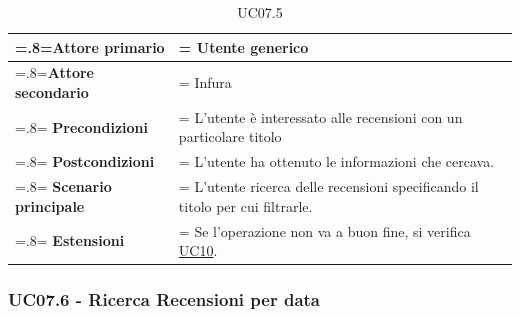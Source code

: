             \begin{table}[H]
                \centering
                \renewcommand{\arraystretch}{1.8}
                \renewcommand\tabularxcolumn[1]{m{#1}}
                \begin{tabularx}{0.9\textwidth} {
                    >{\hsize=.8\hsize\linewidth=\hsize}X
                    >{\hsize=1.2\hsize\linewidth=\hsize}X}
                    \hline
                    \textbf{Attore primario} & Utente generico \\
                    \hline
                    \textbf{Attore secondario} & Infura \\
                    \hline
                    \textbf{Precondizioni} & L'utente è interessato alle recensioni con un particolare titolo \\
                    \hline
                    \textbf{Postcondizioni} & L'utente ha ottenuto le informazioni che cercava. \\
                    \hline
                    \textbf{Scenario principale} & L'utente ricerca delle recensioni specificando il titolo per cui filtrarle.\\
                    \hline
                    \textbf{Estensioni} & Se l'operazione non va a buon fine, si verifica \hyperref[UC10]{UC10}. \\
                    \hline
                \end{tabularx}
                \caption{UC07.5}
            \end{table}

        \subsubsection{UC07.6 - Ricerca Recensioni per data}
        \label{UC07.6}

